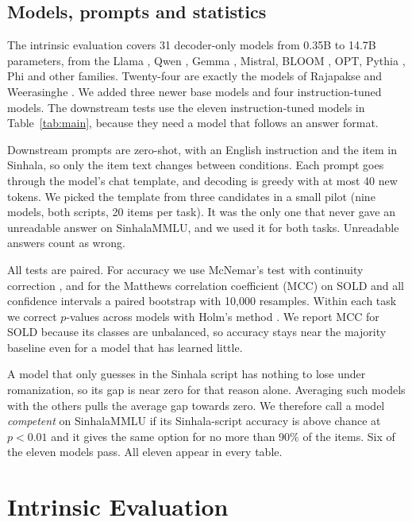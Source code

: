 \documentclass[3p,times,procedia]{elsarticle}
\begin{document}
\subsection{Models, prompts and statistics}
\label{sec:screen}

The intrinsic evaluation covers 31 decoder-only models from 0.35B to 14.7B parameters, from the Llama \cite{llama3}, Qwen \cite{qwen2,qwen3}, Gemma \cite{gemma2}, Mistral, BLOOM \cite{bloom}, OPT, Pythia \cite{pythia}, Phi \cite{phi4} and other families. Twenty-four are exactly the models of Rajapakse and Weerasinghe \cite{rajapakse}. We added three newer base models and four instruction-tuned models. The downstream tests use the eleven instruction-tuned models in Table~\ref{tab:main}, because they need a model that follows an answer format.

Downstream prompts are zero-shot, with an English instruction and the item in Sinhala, so only the item text changes between conditions. Each prompt goes through the model's chat template, and decoding is greedy with at most 40 new tokens. We picked the template from three candidates in a small pilot (nine models, both scripts, 20 items per task). It was the only one that never gave an unreadable answer on SinhalaMMLU, and we used it for both tasks. Unreadable answers count as wrong.

All tests are paired. For accuracy we use McNemar's test with continuity correction \cite{mcnemar}, and for the Matthews correlation coefficient (MCC) on SOLD and all confidence intervals a paired bootstrap with 10{,}000 resamples. Within each task we correct $p$-values across models with Holm's method \cite{holm}. We report MCC for SOLD because its classes are unbalanced, so accuracy stays near the majority baseline even for a model that has learned little.

A model that only guesses in the Sinhala script has nothing to lose under romanization, so its gap is near zero for that reason alone. Averaging such models with the others pulls the average gap towards zero. We therefore call a model \emph{competent} on SinhalaMMLU if its Sinhala-script accuracy is above chance at $p < 0.01$ and it gives the same option for no more than 90\% of the items. Six of the eleven models pass. All eleven appear in every table.

\section{Intrinsic Evaluation}
\label{sec:intrinsic}
\end{document}
